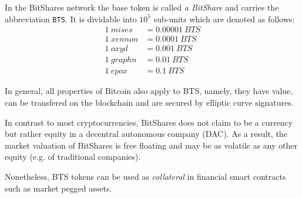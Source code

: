 In the BitShares network the base token is called \emph{a BitShare} and carries
the abbreviation \texttt{BTS}. It is dividable into $10^5$ sub-units which are
denoted as follows:
\begin{align*}
\SI{1}{mises } &= \SI{0.00001}{BTS}\\
\SI{1}{xennon} &= \SI{0.0001}{BTS}\\
\SI{1}{oxyd  } &= \SI{0.001}{BTS}\\
\SI{1}{graphn} &= \SI{0.01}{BTS}\\
\SI{1}{epox  } &= \SI{0.1}{BTS}
\end{align*}

In general, all properties of Bitcoin also apply to BTS, namely, they have
value, can be transfered on the blockchain and are secured by elliptic curve
signatures.

In contrast to most cryptocurrencies, BitShares does not claim to be a currency
but rather equity in a decentral autonomous company (DAC). As a result, the
market valuation of BitShares is free floating and may be as volatile as any
other equity (e.g. of traditional companies).

Nonetheless, BTS tokens can be used as \emph{collateral} in financial smart
contracts~\cite{bts:financial} such as market pegged assets.

